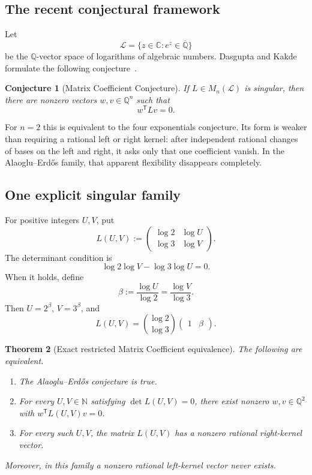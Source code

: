 \documentclass[11pt,oneside]{article}
\newtheorem{theorem}{Theorem}[section]
\newtheorem{conjecture}[theorem]{Conjecture}
\theoremstyle{definition}
\theoremstyle{remark}
\newcommand{\N}{\mathbb N}
\newcommand{\Q}{\mathbb Q}
\newcommand{\C}{\mathbb C}
\newcommand{\Abar}{\overline{\mathbb Q}}
\newcommand{\LL}{\mathcal L}
\begin{document}
\subsection{The recent conjectural framework}

Let
\[
 \LL=\{z\in\C:e^z\in\Abar\}
\]
be the $\Q$-vector space of logarithms of algebraic numbers.  Dasgupta and Kakde formulate
the following conjecture~\cite{DasguptaKakde2026}.

\begin{conjecture}[Matrix Coefficient Conjecture]
\label{c3:conj-mcc}
If $L\in M_n(\LL)$ is singular, then there are nonzero vectors
$w,v\in\Q^n$ such that
\[
 w^{\mathsf T}Lv=0.
\]
\end{conjecture}

For $n=2$ this is equivalent to the four exponentials conjecture.  Its form is weaker than
requiring a rational left or right kernel: after independent rational changes of bases on the
left and right, it asks only that one coefficient vanish.  In the Alaoglu--Erd\H{o}s family,
that apparent flexibility disappears completely.

\subsection{One explicit singular family}

For positive integers $U,V$, put
\begin{equation}
 L(U,V):=
 \begin{pmatrix}
  \log 2&\log U\\
  \log 3&\log V
 \end{pmatrix}.
 \label{c3:eq-logmatrix}
\end{equation}
The determinant condition is
\begin{equation}
 \log2\log V-\log3\log U=0.
 \label{c3:eq-detzero}
\end{equation}
When it holds, define
\[
 \beta:=\frac{\log U}{\log2}=\frac{\log V}{\log3}.
\]
Then $U=2^\beta$, $V=3^\beta$, and
\begin{equation}
 L(U,V)=
 \binom{\log2}{\log3}
 \begin{pmatrix}1&\beta\end{pmatrix}.
 \label{c3:eq-rankonefactor}
\end{equation}

\begin{theorem}[Exact restricted Matrix Coefficient equivalence]
\label{c3:thm-restricted-mcc}
The following are equivalent.
\begin{enumerate}
\item The Alaoglu--Erd\H{o}s conjecture is true.
\item For every $U,V\in\N$ satisfying $\det L(U,V)=0$, there exist nonzero
      $w,v\in\Q^2$ with $w^{\mathsf T}L(U,V)v=0$.
\item For every such $U,V$, the matrix $L(U,V)$ has a nonzero rational right-kernel vector.
\end{enumerate}
Moreover, in this family a nonzero rational left-kernel vector never exists.
\end{theorem}
\end{document}
